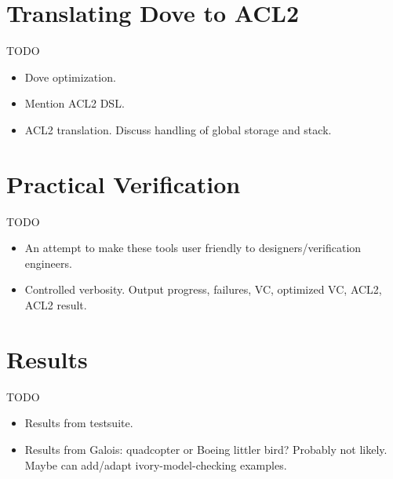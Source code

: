 \documentclass{article}
\begin{document}

\section{Translating Dove to ACL2}
TODO
\begin{itemize}
  \item Dove optimization.
  \item Mention ACL2 DSL.
  \item ACL2 translation.  Discuss handling of global storage and stack.
\end{itemize}

\section{Practical Verification}
TODO
\begin{itemize}
  \item An attempt to make these tools user friendly to designers/verification engineers.
  \item Controlled verbosity.  Output progress, failures, VC, optimized VC, ACL2, ACL2 result.
\end{itemize}

\section{Results}
TODO
\begin{itemize}
  \item Results from testsuite.
  \item Results from Galois: quadcopter or Boeing littler bird?  Probably not likely.  Maybe can add/adapt ivory-model-checking examples.
\end{itemize}
\end{document}
